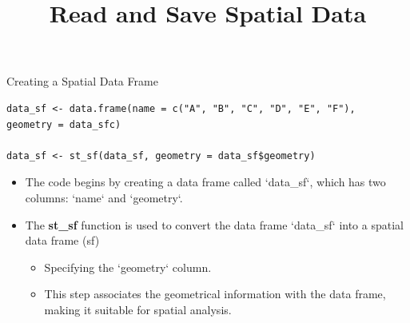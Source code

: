 \documentclass[hyperref={pdfpagelabels=false}]{beamer}
\begin{document}
\begin{frame}[fragile]{Creating a Spatial Data Frame}{}
\begin{lstlisting}
data_sf <- data.frame(name = c("A", "B", "C", "D", "E", "F"),
geometry = data_sfc)

data_sf <- st_sf(data_sf, geometry = data_sf$geometry)
\end{lstlisting}
\begin{itemize}
	\item The code begins by creating a data frame called `data\_sf`, which has two columns: `name` and `geometry`.
	\vspace{0.2cm}
	\item The \textbf{st\_sf} function is used to convert the data frame `data\_sf` into a spatial data frame (sf) 
		\vspace{0.2cm}
	\begin{itemize}
	\item Specifying the `geometry` column. 
		\vspace{0.2cm}
	\item This step associates the geometrical information with the data frame, making it suitable for spatial analysis.
\end{itemize}
\end{itemize}
\end{frame}



\title[]  
{Read and Save Spatial Data}


\author 
{}

\institute{}






\date
{}


\begin{frame}{}
\titlepage
\end{frame}
\end{document}

